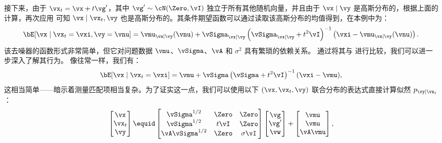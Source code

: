 \documentclass[../../book-main_zh.tex]{subfiles}
\begin{document}
\begin{example}
    接下来，由于 $\vx_t = \vx + t \vg'$，其中 $\vg' \sim \cN(\Zero, \vI)$ 独立于所有其他随机向量，并且由于 $\vx \mid \vy$ 是高斯分布的，根据上面的计算，再次应用  可知 $\vx \mid \vx_t, \vy$ 也是高斯分布的。其条件期望函数可以通过读取该高斯分布的均值得到，在本例中为：
    \begin{equation}\label{eq:conditional-posterior-denoiser-gaussian-case}
        \bE[ \vx \mid \vx_t=\vxi, \vy=\vnu ]
        =
        \vmu_{\vx\mid \vy}(\vnu) + \vSigma_{\vx\mid\vy}\left(
            \vSigma_{\vx\mid \vy} + t^2 \vI
        \right)^{-1}\left(
            \vxi - \vmu_{\vx\mid \vy}(\vnu)
        \right).
    \end{equation}
    该去噪器的函数形式非常简单，但它对问题数据 $\vmu$、$\vSigma$、$\vA$ 和 $\sigma^2$ 具有繁琐的依赖关系。
    通过将其与  进行比较，我们可以进一步深入了解其行为。
    像往常一样，我们有：
    \begin{equation}\label{eq:posterior-denoiser-gaussian-case}
        \bE[\vx \mid \vx_t=\vxi]
        = \vmu + \vSigma\left(\vSigma + t^2 \vI\right)^{-1} (\vxi - \vmu),
    \end{equation}
    这相当简单——暗示着测量匹配项相当复杂。为了证实这一点，我们可以使用以下 $(\vx, \vx_t, \vy)$ 联合分布的表达式直接计算似然 $p_{\vy \mid \vx_t}$：
    \begin{equation}
        \begin{bmatrix}
            \vx \\
            \vx_t \\
            \vy
        \end{bmatrix}
        \equid
        \begin{bmatrix}
            \vSigma^{1/2} & \Zero & \Zero \\
            \vSigma^{1/2} & t\vI & \Zero \\
            \vA \vSigma^{1/2} & \Zero & \sigma \vI
        \end{bmatrix}
        \begin{bmatrix}
            \vg \\
            \vg' \\
            \vw
        \end{bmatrix}
        +
        \begin{bmatrix}
            \vmu \\
            \vmu \\
            \vA\vmu
        \end{bmatrix},

\end{equation}
\end{example}
\end{document}
